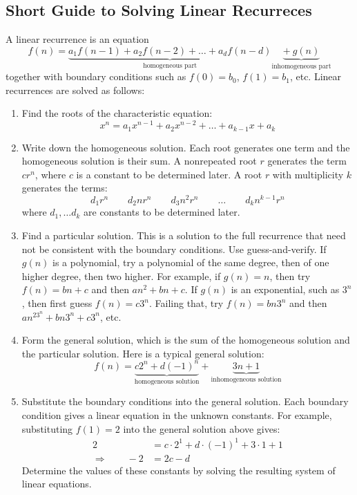 \begin{center}
\subsection*{Short Guide to Solving Linear Recurreces}
\end{center}

A linear recurrence is an equation
\begin{equation*}
f(n) = \underbrace{a_1 f(n-1) + a_2 f(n-2) + \ldots + a_d f(n -
  d)}_{\text{homogeneous part}}
\underbrace{+\ g(n)}_{\text{inhomogeneous part}}
\end{equation*}
together with boundary conditions such as $f(0) = b_0$, $f(1) = b_1$,
etc.  Linear recurrences are solved as follows:

\begin{enumerate}
\item Find the roots of the characteristic equation:
\begin{equation*}
x^n = a_1 x^{n-1} + a_2 x^{n-2} + \ldots + a_{k-1} x + a_k
\end{equation*}
\item Write down the homogeneous solution.  Each root generates one
  term and the homogeneous solution is their sum.  A nonrepeated root
  $r$ generates the term $c r^n$, where $c$ is a constant to be
  determined later.  A root $r$ with multiplicity $k$ generates the
  terms:
\[
d_{1} r^n \qquad d_2 n r^n \qquad d_3 n^2 r^n \qquad \ldots \qquad d_k n^{k-1} r^n
\]
where $d_1, \ldots d_k$ are constants to be determined later.
\item Find a particular solution.  This is a solution to the full
  recurrence that need not be consistent with the boundary
  conditions.  Use guess-and-verify.  If $g(n)$ is a polynomial, try a
  polynomial of the same degree, then of one higher degree, then two
  higher.  For example, if $g(n) = n$, then try $f(n) = bn + c$ and
  then $an^2 + bn + c$.  If $g(n)$ is an exponential, such as $3^n$,
  then first guess $f(n) = c3^n$.  Failing that, try $f(n) = bn3^n$
  and then $an^23^n + bn3^n + c3^n$, etc.
\item Form the general solution, which is the sum of the homogeneous
  solution and the particular solution.  Here is a typical general
  solution:
\begin{equation*}
f(n) = \underbrace{c2^n + d(-1)^n}_{\text{homogeneous solution}} +
\underbrace{3n + 1}_{\text{inhomogeneous solution}}
\end{equation*}
\item Substitute the boundary conditions into the general solution.
  Each boundary condition gives a linear equation in the unknown
  constants.  For example, substituting $f(1) = 2$ into the general
  solution above gives:
\begin{align*}
2 & = c\cdot2^1 + d \cdot(-1)^1 + 3 \cdot 1 + 1 \\
\Rightarrow \qquad -2 & = 2c - d
\end{align*}
Determine the values of these constants by solving the resulting
system of linear equations.
\end{enumerate}


